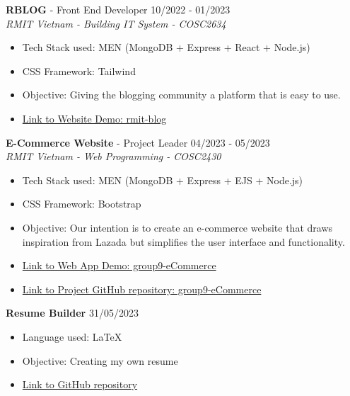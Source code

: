 \documentclass[11pt]{article}
\newcommand{\job}[3]{
    \begingroup
        \textbf{\small#1} - \small#2
        \hfill\color{black!70}\small{#3}
    \endgroup
}
\newcommand{\project}[2]{
    \begingroup
        \textbf{\small#1}
        \hfill\color{black!70}\small{#2}
    \endgroup
}
\newcommand{\spacevv}{
    \vspace{2mm}
}
\begin{document}
\begin{paracol}{2}
{      \job{RBLOG}{Front End Developer}{10/2022 - 01/2023} \\
      \textcolor{black!70}{\textit{RMIT Vietnam - Building IT System - COSC2634}}
\vspace{1mm}
      \begin{itemize}
        \item Tech Stack used: MEN (MongoDB + Express + React + Node.js)
\vspace{1mm}
        \item CSS Framework: Tailwind
\vspace{1mm}
        \item Objective: Giving the blogging community a platform that is easy to use.
\vspace{1mm}
        \item  \href{https://rmit-blog.netlify.app/}{Link to Website Demo: rmit-blog}
      \end{itemize}
      \spacevv
\vspace{2mm}
      \job{E-Commerce Website}{Project Leader}{04/2023 - 05/2023} \\
      \textcolor{black!70}{\textit{RMIT Vietnam - Web Programming - COSC2430}}
\vspace{1mm}
      \begin{itemize}
        \item Tech Stack used: MEN (MongoDB + Express + EJS + Node.js)
\vspace{1mm}
        \item CSS Framework: Bootstrap
\vspace{1mm}
        \item Objective: Our intention is to create an e-commerce website that draws inspiration from Lazada but simplifies the user interface and functionality.
\vspace{1mm}
        \item  \href{https://group9ecommerceweb-dolelongan.b4a.run/}{Link to Web App Demo: group9-eCommerce}
\vspace{1mm}
        \item  \href{https://github.com/LaansDole/Group9_E-commerce_Website}{Link to Project GitHub repository: group9-eCommerce}
      \end{itemize}
      \spacevv
\vspace{2mm}
\project{Resume Builder}{31/05/2023}
      \begin{itemize}
        \item Language used: LaTeX
\vspace{1mm}
        \item Objective: Creating my own resume
\vspace{1mm}
        \item  \href{https://github.com/LaansDole/my-resume}{Link to GitHub repository}
      \end{itemize}
    }


\end{paracol}
\end{document}
